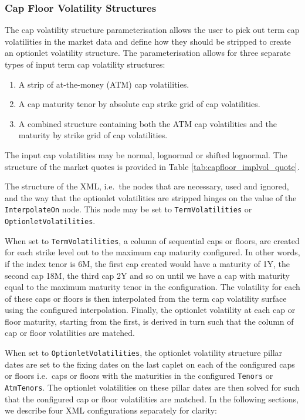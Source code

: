 \subsubsection{Cap Floor Volatility Structures}

The cap volatility structure parameterisation allows the user to pick out term cap volatilities in the market data and define how they should be stripped to create an optionlet volatility structure. The parameterisation allows for three separate types of input term cap volatility structures:

\begin{enumerate}
\item A strip of at-the-money (ATM) cap volatilities.
\item A cap maturity tenor by absolute cap strike grid of cap volatilities.
\item A combined structure containing both the ATM cap volatilities and the maturity by strike grid of cap volatilities.
\end{enumerate}

The input cap volatilities may be normal, lognormal or shifted lognormal. The structure of the market quotes is provided in Table \ref{tab:capfloor_implvol_quote}.

The structure of the XML, i.e.\ the nodes that are necessary, used and ignored, and the way that the optionlet volatilities are stripped hinges on the value of the \lstinline!InterpolateOn! node. This node may be set to \lstinline!TermVolatilities! or \lstinline!OptionletVolatilities!.

When set to \lstinline!TermVolatilities!, a column of sequential caps or floors, are created for each strike level out to the maximum cap maturity configured. In other words, if the index tenor is 6M, the first cap created would have a maturity of 1Y, the second cap 18M, the third cap 2Y and so on until we have a cap with maturity equal to the maximum maturity tenor in the configuration. The volatility for each of these caps or floors is then interpolated from the term cap volatility surface using the configured interpolation. Finally, the optionlet volatility at each cap or floor maturity, starting from the first, is derived in turn such that the column of cap or floor volatilities are matched.

When set to \lstinline!OptionletVolatilities!, the optionlet volatility structure pillar dates are set to the fixing dates on the last caplet on each of the configured caps or floors i.e.\ caps or floors with the maturities in the configured \lstinline!Tenors! or \lstinline!AtmTenors!. The optionlet volatilities on these pillar dates are then solved for such that the configured cap or floor volatilities are matched. In the following sections, we describe four XML configurations separately for clarity:

